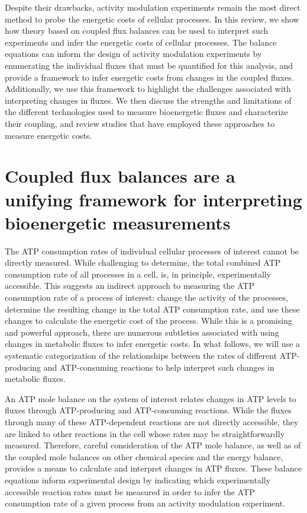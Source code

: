 \documentclass{compactarticle}
\begin{document}
Despite their drawbacks, activity modulation experiments remain the most direct method to probe the energetic costs of cellular processes. In this review, we show how theory based on coupled flux balances can be used to interpret such experiments and infer the energetic costs of cellular processes. The balance equations can inform the design of activity modulation experiments by enumerating the individual fluxes that must be quantified for this analysis, and provide a framework to infer energetic costs from changes in the coupled fluxes. Additionally, we use this framework to highlight the challenges associated with interpreting changes in fluxes. We then discuss the strengths and limitations of the different technologies used to measure bioenergetic fluxes and characterize their coupling, and review studies that have employed these approaches to measure energetic costs.

\section{Coupled flux balances are a unifying framework for interpreting bioenergetic measurements}
\label{sec:balances}

The ATP consumption rates of individual cellular processes of interest cannot be directly measured. While challenging to determine, the total combined ATP consumption rate of all processes in a cell, is, in principle, experimentally accessible. This suggests an indirect approach to measuring the ATP consumption rate of a process of interest: change the activity of the processes, determine the resulting change in the total ATP consumption rate, and use these changes to calculate the energetic cost of the process. While this is a promising and powerful approach, there are numerous subtleties associated with using changes in metabolic fluxes to infer energetic costs. In what follows, we will use a systematic categorization of the relationships between the rates of different ATP-producing and ATP-consuming reactions to help interpret such changes in metabolic fluxes.

An ATP mole balance on the system of interest relates changes in ATP levels to fluxes through ATP-producing and ATP-consuming reactions. While the fluxes through many of these ATP-dependent reactions are not directly accessible, they are linked to other reactions in the cell whose rates may be straightforwardly measured. Therefore, careful consideration of the ATP mole balance, as well as of the coupled mole balances on other chemical species and the energy balance, provides a means to calculate and interpret changes in ATP fluxes. These balance equations inform experimental design by indicating which experimentally accessible reaction rates must be measured in order to infer the ATP consumption rate of a given process from an activity modulation experiment. 
\end{document}
